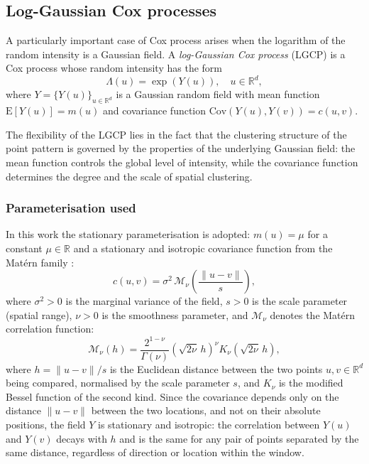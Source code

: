 \documentclass[a4paper,fleqn]{cas-sc}
\numberwithin{equation}{section}
\begin{document}
\subsection{Log-Gaussian Cox processes}
\label{sec:lgcp_theory}

A particularly important case of Cox process arises when the logarithm
of the random intensity is a Gaussian field. A \emph{log-Gaussian Cox
process} (LGCP) \citep{Moller1998} is a Cox process whose random
intensity has the form
\begin{equation}
    \Lambda(u) = \exp(Y(u)), \quad u\in\mathbb{R}^d,
    \label{eq:lgcp_intensity}
\end{equation}
where $Y=\{Y(u)\}_{u\in\mathbb{R}^d}$ is a Gaussian random field with
mean function $\mathrm{E}[Y(u)]=m(u)$ and covariance function
$\mathrm{Cov}(Y(u),Y(v))=c(u,v)$.

The flexibility of the LGCP lies in the fact that the clustering
structure of the point pattern is governed by the properties of the
underlying Gaussian field: the mean function controls the global level
of intensity, while the covariance function determines the degree and
the scale of spatial clustering.

\subsubsection{Parameterisation used}

In this work the stationary parameterisation is adopted: $m(u)=\mu$
for a constant $\mu\in\mathbb{R}$ and a stationary and isotropic
covariance function from the Mat\'ern family
\citep{Matern1960, Stein1999}:
\begin{equation}
    c(u,v) = \sigma^2\,\mathcal{M}_{\nu}\!\left(\frac{\|u-v\|}{s}\right),
    \label{eq:cov_matern}
\end{equation}
where $\sigma^2>0$ is the marginal variance of the field, $s>0$ is the
scale parameter (spatial range), $\nu>0$ is the smoothness parameter,
and $\mathcal{M}_{\nu}$ denotes the Mat\'ern correlation function:
\begin{equation}
    \mathcal{M}_{\nu}(h) =
    \frac{2^{1-\nu}}{\Gamma(\nu)}\left(\sqrt{2\nu}\,h\right)^{\nu}
    K_{\nu}\!\left(\sqrt{2\nu}\,h\right),
    \label{eq:matern_corr}
\end{equation}
where $h=\|u-v\|/s$ is the Euclidean distance between the two points
$u,v\in\mathbb{R}^d$ being compared, normalised by the scale parameter
$s$, and $K_{\nu}$ is the modified Bessel function of the second kind.
Since the covariance depends only on the distance $\|u-v\|$ between the
two locations, and not on their absolute positions, the field $Y$ is
stationary and isotropic: the correlation between $Y(u)$ and $Y(v)$
decays with $h$ and is the same for any pair of points separated by
the same distance, regardless of direction or location within the
window.
\end{document}
